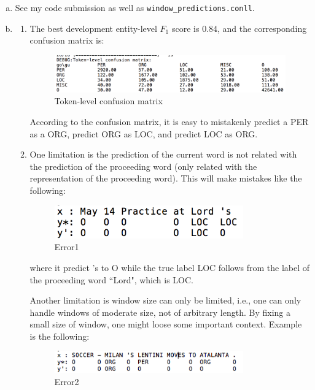 \documentclass[11pt, oneside]{article}      %
\newcommand{\hasPageBreak}{}
\begin{document}
\begin{enumerate}   [(a)]
\item
See my code submission as well as \texttt{window\_predictions.conll}.



\hasPageBreak
\item
\begin{enumerate}   [i]
\item 
The best development entity-level $F_1$ score is 0.84, and the corresponding confusion matrix is:

\begin{figure}[htbp] %
   \centering
   \includegraphics[width=5.2in]{Q1_confusion.png} 
   \caption{Token-level confusion matrix}
   \label{Fig:Q1_confusion}
\end{figure}

According to the confusion matrix, it is easy to mistakenly predict a PER as a ORG, predict ORG as LOC, and predict LOC as ORG.


\item
One limitation is the prediction of the current word is not related with the prediction of the proceeding word (only related with the representation of the proceeding word). This will make mistakes like the following:

\begin{figure}[htbp] %
   \centering
   \includegraphics[width=3.2in]{Q1_error1.png} 
   \caption{Error1}
   \label{Fig:Q1_error1}
\end{figure}

where it predict 's to O while the true label LOC follows from the label of the proceeding word ``Lord", which is LOC.


Another limitation is window size can only be limited, i.e., one can only handle windows of moderate size, not of arbitrary length. By fixing a small size of window, one might loose some important context. Example is the following:
\begin{figure}[htbp] %
   \centering
   \includegraphics[width=3.2in]{Q1_error2.png} 
   \caption{Error2}
   \label{Fig:Q1_error2}
\end{figure}


\end{enumerate}
\end{enumerate}
\end{document}
